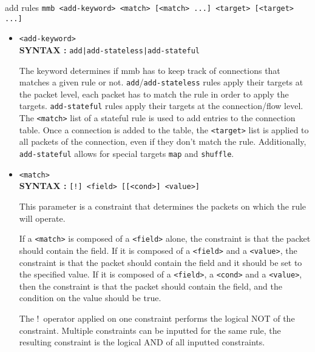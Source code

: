 \documentclass[a4paper,twoside,11pt]{report}
\makeatletter
\renewcommand{\section}{\@startsection{section}{1}{0mm}
  {\baselineskip}%
  {\baselineskip}{\LARGE\color{black}}}%
\makeatother
\begin{document}
\section{add rules}
\texttt{mmb <add-keyword> <match> [<match> ...] <target> [<target> ...]}
\begin{itemize}

\item \texttt{<add-keyword>}\\
   \textbf{SYNTAX :} \texttt{add|add-stateless|add-stateful} 

   The keyword determines if mmb has to keep track of connections that matches
   a given rule or not. \texttt{add}/\texttt{add-stateless} rules apply their
   targets at the packet level, each packet has to match the rule in order
   to apply the targets. \texttt{add-stateful} rules apply their targets at the
   connection/flow level. The \texttt{<match>} list of a stateful rule is used
   to add entries to the connection table. Once a connection is added to the table,
   the \texttt{<target>} list is applied to all packets of the connection, even if 
   they don't match the rule. Additionally, \texttt{add-stateful} allows for
   special targets \texttt{map} and \texttt{shuffle}.

\item \texttt{<match>} \\
   \textbf{SYNTAX :} \texttt{[!]\ <field> [[<cond>] <value>]} 

   This parameter is a constraint that determines the packets on which the 
   rule will operate. 

   If a \texttt{<match>} is composed of a \texttt{<field>} alone, the constraint
   is that the packet should contain the field. If it is composed of a 
   \texttt{<field>} and a \texttt{<value>}, the constraint is that the packet 
   should contain the field and it should be set to the specified value. If it 
   is composed of a \texttt{<field>}, a \texttt{<cond>} and a \texttt{<value>},
   then the constraint is that the packet should contain the field, and the 
   condition on the value should be true.
   
   The !\ operator applied on one constraint performs the logical NOT of 
   the constraint. Multiple constraints can be inputted for the same rule, the 
   resulting constraint is the logical AND of all inputted constraints. 


\end{itemize}
\end{document}
